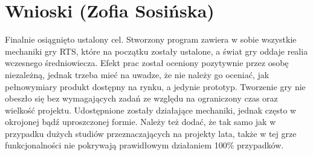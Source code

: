 \section{Wnioski (Zofia Sosińska)}
Finalnie osiągnięto ustalony cel. Stworzony program zawiera w sobie wszystkie mechaniki gry RTS,
które na początku zostały ustalone, a świat gry oddaje realia wczesnego średniowiecza. 
Efekt prac został oceniony pozytywnie przez osobę niezależną, jednak trzeba mieć na uwadze, 
że nie należy go oceniać, jak pełnowymiary produkt dostępny na rynku, a jedynie prototyp.
Tworzenie gry nie obeszło się bez wymagających zadań ze względu na ograniczony czas oraz wielkość 
projektu. Udostępnione zostały działające mechaniki, jednak często w okrojonej bądź uproszczonej formie.
Należy też dodać, że tak samo jak w przypadku dużych studiów przeznaczających na projekty lata, także 
w tej grze funkcjonalności nie pokrywają prawidłowym działaniem 100\% przypadków.